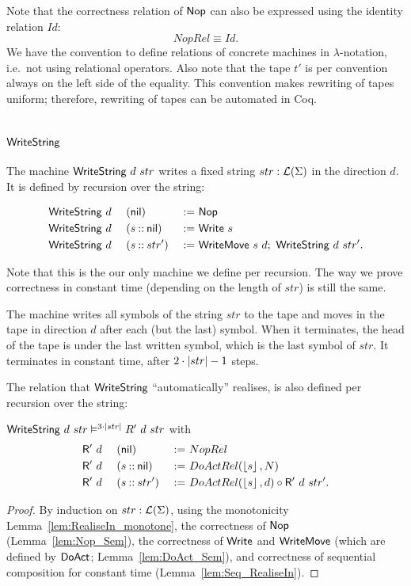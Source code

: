 Note that the correctness relation of $\mathsf{Nop}$ can also be expressed using the identity relation $Id$:
\[
  NopRel \equiv Id.
\]
We have the convention to define relations of concrete machines in $\lambda$-notation, i.e.\ not using relational operators.  Also note that
the tape $t'$ is per convention always on the left side of the equality.  This convention makes rewriting of tapes uniform; therefore, rewriting of
tapes can be automated in Coq.

\section{$\MS{WriteString}$}
\label{sec:WriteString}

The machine $\mathsf{WriteString}~d~str$ writes a fixed string $str:\mathcal{L}(\Sigma)$ in the direction $d$.  It is defined by recursion over the string:
\begin{definition}[$\MS{WriteString}$]
  \begin{alignat*}{3}
    &\mathsf{WriteString}~d~&&(\mathsf{nil})         &~:=~& \mathsf{Nop} \\
    &\mathsf{WriteString}~d~&&(s \mathbin{::} \mathsf{nil}) &~:=~& \mathsf{Write}~s \\
    &\mathsf{WriteString}~d~&&(s \mathbin{::} str') &~:=~& \mathsf{WriteMove}~s~d ;~ \mathsf{WriteString}~d~str'.
  \end{alignat*}
\end{definition}

Note that this is the our only machine we define per recursion.  The way we prove correctness in constant time (depending on the length of
$str$) is still the same.

The machine writes all symbols of the string $str$ to the tape and moves in the tape in direction $d$ after each (but the last) symbol.  When it
terminates, the head of the tape is under the last written symbol, which is the last symbol of $str$.  It terminates in constant time, after
$2\cdot\left| str \right|-1$ steps.

The relation that $\MS{WriteString}$ ``automatically'' realises, is also defined per recursion over the string:
\begin{lemma}
  $\mathsf{WriteString}~d~str \mathrel{\vDash^{3 \cdot \left| str \right|}} R'~d~str$ with
  \begin{alignat*}{3}
    &\mathsf{R'}~d~&&(\mathsf{nil}        ) &~:=~& NopRel \\
    &\mathsf{R'}~d~&&(s \mathbin{::} \mathsf{nil}) &~:=~& DoActRel(\left\lfloor {s} \right\rfloor, N) \\
    &\mathsf{R'}~d~&&(s \mathbin{::} str') &~:=~& DoActRel(\left\lfloor {s} \right\rfloor, d) \circ \mathsf{R'}~d~str'.
  \end{alignat*}
\end{lemma}
\begin{proof}
  By induction on $str:\mathcal{L}(\Sigma)$, using the monotonicity Lemma~\ref{lem:RealiseIn_monotone}, the correctness of $\mathsf{Nop}$ (Lemma~\ref{lem:Nop_Sem}),
  the correctness of $\mathsf{Write}$ and $\mathsf{WriteMove}$ (which are defined by $\mathsf{DoAct}$; Lemma~\ref{lem:DoAct_Sem}), and correctness of sequential
  composition for constant time (Lemma~\ref{lem:Seq_RealiseIn}).
\end{proof}

